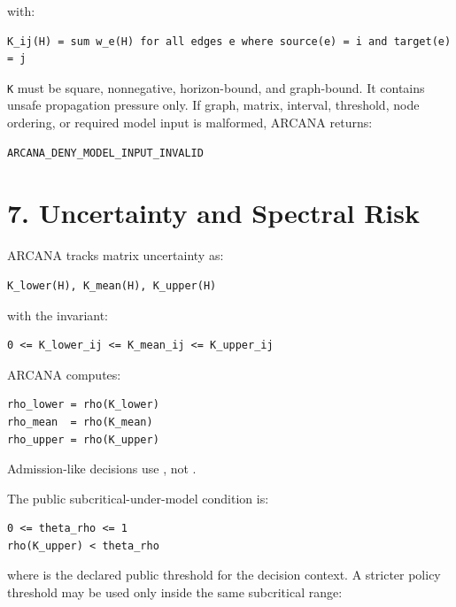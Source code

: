 \documentclass[
  american,
  a4paper,
  10pt]{article}
\begin{document}
with:

\begin{Verbatim}[breaklines=true,breakanywhere=true,fontsize=\small]
K_ij(H) = sum w_e(H) for all edges e where source(e) = i and target(e) = j
\end{Verbatim}

\texttt{K} must be square, nonnegative, horizon-bound, and graph-bound. It contains
unsafe propagation pressure only. If graph, matrix, interval, threshold, node ordering,
or required model input is malformed, ARCANA returns:

\begin{Verbatim}[breaklines=true,breakanywhere=true,fontsize=\small]
ARCANA_DENY_MODEL_INPUT_INVALID
\end{Verbatim}

\section{7. Uncertainty and Spectral Risk}\label{7-uncertainty-and-spectral-risk}

ARCANA tracks matrix uncertainty as:

\begin{Verbatim}[breaklines=true,breakanywhere=true,fontsize=\small]
K_lower(H), K_mean(H), K_upper(H)
\end{Verbatim}

with the invariant:

\begin{Verbatim}[breaklines=true,breakanywhere=true,fontsize=\small]
0 <= K_lower_ij <= K_mean_ij <= K_upper_ij
\end{Verbatim}

ARCANA computes:

\begin{Verbatim}[breaklines=true,breakanywhere=true,fontsize=\small]
rho_lower = rho(K_lower)
rho_mean  = rho(K_mean)
rho_upper = rho(K_upper)
\end{Verbatim}

Admission-like decisions use , not .

The public subcritical-under-model condition is:

\begin{Verbatim}[breaklines=true,breakanywhere=true,fontsize=\small]
0 <= theta_rho <= 1
rho(K_upper) < theta_rho
\end{Verbatim}

where  is the declared public threshold for the decision context. A
stricter policy threshold may be used only inside the same subcritical range:
\end{document}
